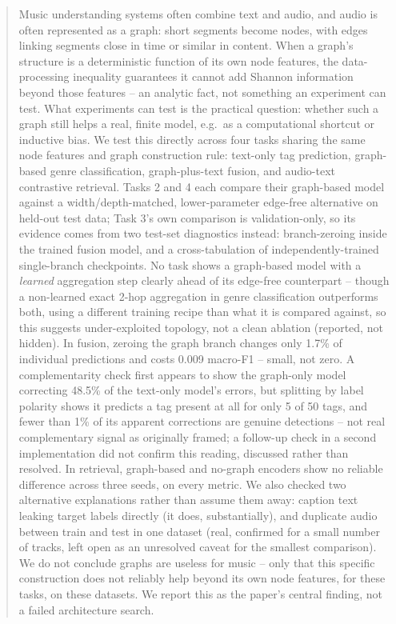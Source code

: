 \begin{abstract}
Music understanding systems often combine text and audio, and audio is often represented as
a graph: short segments become nodes, with edges linking segments close in time or similar
in content. When a graph's structure is a deterministic function of its own node features,
the data-processing inequality guarantees it cannot add Shannon information beyond those
features -- an analytic fact, not something an experiment can test. What experiments can
test is the practical question: whether such a graph still helps a real, finite model, e.g.\
as a computational shortcut or inductive bias. We test this directly across four tasks
sharing the same node features and graph construction rule: text-only tag prediction,
graph-based genre classification, graph-plus-text fusion, and audio-text contrastive
retrieval. Tasks 2 and 4 each compare their graph-based model against a width/depth-matched,
lower-parameter edge-free alternative on held-out test data; Task 3's own comparison is
validation-only, so its evidence comes from two test-set diagnostics instead:
branch-zeroing inside the trained fusion model, and a cross-tabulation of
independently-trained single-branch checkpoints. No task shows a graph-based model with a
\emph{learned} aggregation step clearly ahead of its edge-free counterpart -- though a
non-learned exact 2-hop aggregation in genre classification outperforms both, using a
different training recipe than what it is compared against, so this suggests
under-exploited topology, not a clean ablation (reported, not hidden). In fusion, zeroing
the graph branch changes only 1.7\% of individual predictions and costs 0.009 macro-F1 --
small, not zero. A complementarity check first appears to show the graph-only model
correcting 48.5\% of the text-only model's errors, but splitting by label polarity shows it
predicts a tag present at all for only 5 of 50 tags, and fewer than 1\% of its apparent
corrections are genuine detections -- not real complementary signal as originally framed; a
follow-up check in a second implementation did not confirm this reading, discussed rather
than resolved. In retrieval, graph-based and no-graph encoders show no reliable difference
across three seeds, on every metric. We also checked two alternative explanations rather
than assume them away: caption text leaking target labels directly (it does,
substantially), and duplicate audio between train and test in one dataset (real, confirmed
for a small number of tracks, left open as an unresolved caveat for the smallest
comparison). We do not conclude graphs are useless for music -- only that this specific
construction does not reliably help beyond its own node features, for these tasks, on
these datasets. We report this as the paper's central finding, not a failed architecture
search.
\end{abstract}
